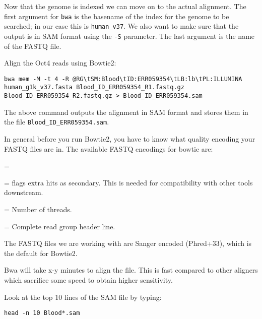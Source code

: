 \begin{information}
Now that the genome is indexed we can move on to the actual alignment. The first
argument for \texttt{bwa} is the basename of the index for the genome to be searched;
in our case this is \texttt{human_v37}. We also want to make sure that the output is
in SAM format using the \texttt{-S} parameter. The last argument is the name of the
FASTQ file.
\end{information}

\begin{steps}
Align the Oct4 reads using Bowtie2: 

\begin{lstlisting}
bwa mem -M -t 4 -R @RG\tSM:Blood\tID:ERR059354\tLB:lb\tPL:ILLUMINA human_g1k_v37.fasta Blood_ID_ERR059354_R1.fastq.gz Blood_ID_ERR059354_R2.fastq.gz > Blood_ID_ERR059354.sam
\end{lstlisting}

The above command outputs the alignment in SAM format and stores them in the
file \texttt{Blood_ID_ERR059354.sam}.
\end{steps}

\begin{note}
In general before you run Bowtie2, you have to know what quality encoding your FASTQ files
are in. The available FASTQ encodings for bowtie are:

\begin{description}[style=multiline,labelindent=0cm,align=right,leftmargin=\descriptionlabelspace,rightmargin=1.5cm,font=\ttfamily]
  \item[mem] =
  \item[-M] = flags extra hits as secondary. This is needed for compatibility with other tools downstream.
  \item[-t] = Number of threads.
  \item[-R] = Complete read group header line.
\end{description}

The FASTQ files we are working with are Sanger encoded (Phred+33), which is the
default for Bowtie2.

Bwa will take x-y minutes to align the file. This is fast compared to
other aligners which sacrifice some speed to obtain higher sensitivity.
\end{note}

\begin{steps}
Look at the top 10 lines of the SAM file by typing:

\begin{lstlisting}
head -n 10 Blood*.sam
\end{lstlisting}
\end{steps}

